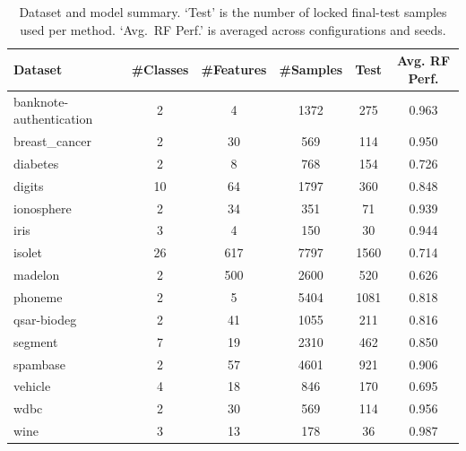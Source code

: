 \documentclass[runningheads]{llncs}
\begin{document}
\begin{table}[t]
  \centering
  \small
  \caption{Dataset and model summary. `Test' is the number of locked final-test samples used per method. `Avg.\ RF Perf.' is averaged across configurations and seeds.}
  \label{tab:datasets-models-summary}
  \begin{tabular}{lccccc}
    \toprule
    Dataset & \#Classes & \#Features & \#Samples & Test & Avg. RF Perf. \\
    \midrule
    banknote-authentication & 2 & 4 & 1372 & 275 & 0.963 \\
    breast\_cancer & 2 & 30 & 569 & 114 & 0.950 \\
    diabetes & 2 & 8 & 768 & 154 & 0.726 \\
    digits & 10 & 64 & 1797 & 360 & 0.848 \\
    ionosphere & 2 & 34 & 351 & 71 & 0.939 \\
    iris & 3 & 4 & 150 & 30 & 0.944 \\
    isolet & 26 & 617 & 7797 & 1560 & 0.714 \\
    madelon & 2 & 500 & 2600 & 520 & 0.626 \\
    phoneme & 2 & 5 & 5404 & 1081 & 0.818 \\
    qsar-biodeg & 2 & 41 & 1055 & 211 & 0.816 \\
    segment & 7 & 19 & 2310 & 462 & 0.850 \\
    spambase & 2 & 57 & 4601 & 921 & 0.906 \\
    vehicle & 4 & 18 & 846 & 170 & 0.695 \\
    wdbc & 2 & 30 & 569 & 114 & 0.956 \\
    wine & 3 & 13 & 178 & 36 & 0.987 \\
    \bottomrule
  \end{tabular}
\end{table}
\end{document}
